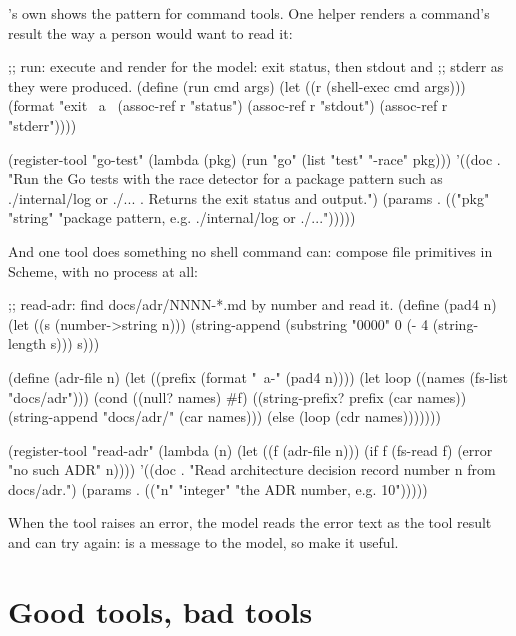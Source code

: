 \nodwyn's own  shows the pattern for command tools. One
helper renders a command's result the way a person would want to read it:

\begin{scm}
;; run: execute and render for the model: exit status, then stdout and
;; stderr as they were produced.
(define (run cmd args)
  (let ((r (shell-exec cmd args)))
    (format "exit ~a~%
            (assoc-ref r "status")
            (assoc-ref r "stdout")
            (assoc-ref r "stderr"))))

(register-tool "go-test"
  (lambda (pkg) (run "go" (list "test" "-race" pkg)))
  '((doc . "Run the Go tests with the race detector for a package pattern such as ./internal/log or ./... . Returns the exit status and output.")
    (params . (("pkg" "string" "package pattern, e.g. ./internal/log or ./...")))))
\end{scm}

And one tool does something no shell command can: compose file primitives
in Scheme, with no process at all:

\begin{scm}
;; read-adr: find docs/adr/NNNN-*.md by number and read it.
(define (pad4 n)
  (let ((s (number->string n)))
    (string-append (substring "0000" 0 (- 4 (string-length s))) s)))

(define (adr-file n)
  (let ((prefix (format "~a-" (pad4 n))))
    (let loop ((names (fs-list "docs/adr")))
      (cond ((null? names) #f)
            ((string-prefix? prefix (car names)) (string-append "docs/adr/" (car names)))
            (else (loop (cdr names)))))))

(register-tool "read-adr"
  (lambda (n)
    (let ((f (adr-file n)))
      (if f (fs-read f) (error "no such ADR" n))))
  '((doc . "Read architecture decision record number n from docs/adr.")
    (params . (("n" "integer" "the ADR number, e.g. 10")))))
\end{scm}

When the tool raises an error, the model reads the error text as the tool
result and can try again:  is a message to
the model, so make it useful.

\section{Good tools, bad tools}

